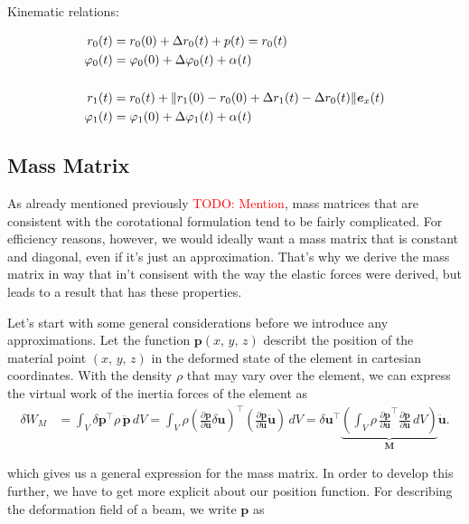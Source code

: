 Kinematic relations:

\begin{align}
r_0(t) &= r_0(0) + \Delta r_0(t) + p(t) = r_0(t) \\
\varphi_0(t) &= \varphi_0(0) + \Delta\varphi_0(t) + \alpha(t) \\
\notag \\
r_1(t) &= r_0(t) + \lVert r_1(0) - r_0(0) + \Delta r_1(t) - \Delta r_0(t) \rVert\boldsymbol{e}_x(t) \\
\varphi_1(t) &= \varphi_1(0) + \Delta\varphi_1(t) + \alpha(t)
\end{align}

\newpage
\subsection{Mass Matrix}

As already mentioned previously \textcolor{red}{TODO: Mention}, mass matrices that are consistent with the corotational formulation tend to be fairly complicated.
For efficiency reasons, however, we would ideally want a mass matrix that is constant and diagonal, even if it's just an approximation.
That's why we derive the mass matrix in way that in't consisent with the way the elastic forces were derived, but leads to a result that has these properties.

Let's start with some general considerations before we introduce any approximations.
Let the function $\boldsymbol{p}(x,\,y,\,z)$ describt the position of the material point $(x,\,y,\,z)$ in the deformed state of the element in cartesian coordinates.
With the density $\rho$ that may vary over the element, we can express the virtual work of the inertia forces of the element as
%
\begin{align}
\delta W_{M} &= \int_{V} \delta\boldsymbol{p}^\intercal\rho\,\ddot{\boldsymbol{p}}\,dV = \int_{V} \rho\left(\frac{\partial\boldsymbol{p}}{\partial\boldsymbol{u}}\delta\boldsymbol{u}\right)^\intercal\left(\frac{\partial\boldsymbol{p}}{\partial\boldsymbol{u}}\ddot{\boldsymbol{u}}\right)\,dV = \delta\boldsymbol{u}^\intercal\underbrace{\left(\int_{V} \rho\,\frac{\partial\boldsymbol{p}}{\partial\boldsymbol{u}}^\intercal\frac{\partial\boldsymbol{p}}{\partial\boldsymbol{u}}\,dV\right)}_{\boldsymbol{M}}\ddot{\boldsymbol{u}}.
\end{align}

which gives us a general expression for the mass matrix.
In order to develop this further, we have to get more explicit about our position function.
For describing the deformation field of a beam, we write $\boldsymbol{p}$ as

